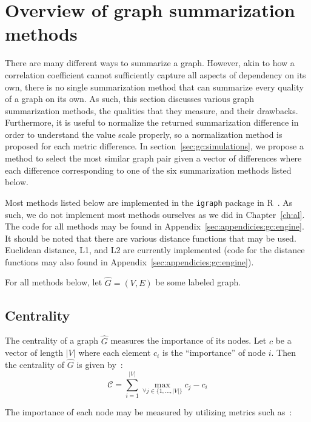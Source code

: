 \section{Overview of graph summarization methods}
\label{sec:gc:methods}

There are many different ways to summarize a graph. However, akin to how a
correlation coefficient cannot sufficiently capture all aspects of dependency 
on its own, there is no single summarization method that can summarize 
every quality of a graph on its own. As such, this section discusses various 
graph summarization methods, the qualities that they measure, and their 
drawbacks. Furthermore, it is useful to normalize the returned 
summarization difference in order to understand the value scale properly, so a 
normalization method is proposed for each metric difference. 
In section~\ref{sec:gc:simulations}, we propose a method to select the most 
similar graph pair given a vector of differences where each difference 
corresponding to one of the six summarization methods listed below.

Most methods listed below are implemented in the \texttt{igraph} package in 
R~\cite{igraph}. As such, we do not implement most methods ourselves 
as we did in Chapter~\ref{ch:al}. The code for 
all methods may be found in Appendix~\ref{sec:appendicies:gc:engine}. It should 
be noted that there are various distance functions that may be used. 
Euclidean distance, L1, and L2 are currently implemented (code for the 
distance functions may also found in Appendix~\ref{sec:appendicies:gc:engine}). 

For all methods below, let $\hat{G}=(V,E)$ be some labeled graph.

\subsection{Centrality}
\label{sec:gc:methods:centrality}

The centrality of a graph $\hat{G}$ measures the importance of its 
nodes. Let $c$ be a vector of length $|V|$ where each element 
$c_i$ is the ``importance'' of node $i$. Then the centrality of $\hat{G}$ is 
given by~\cite{igraph}:
$$\mathcal{C} = \sum\limits^{|V|}_{i=1} \max_{\forall j \in \{1,...,|V|\}} 
c_j - c_i$$

\noindent The importance of each node may be measured by utilizing metrics such 
as~\cite{igraph}:

